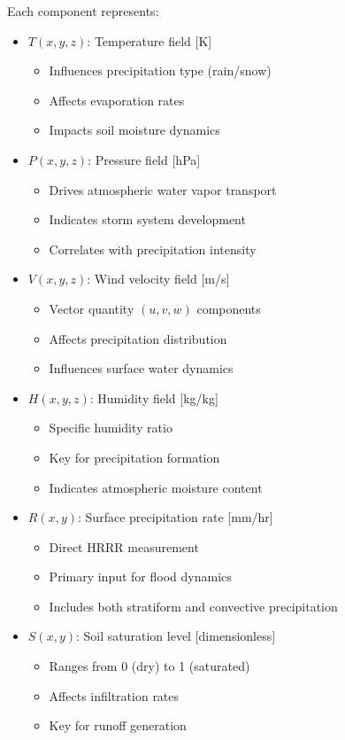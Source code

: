 \documentclass{article}
\begin{document}
Each component represents:
\begin{itemize}
\item $T(x,y,z)$: Temperature field [K]
    \begin{itemize}
    \item Influences precipitation type (rain/snow)
    \item Affects evaporation rates
    \item Impacts soil moisture dynamics
    \end{itemize}

\item $P(x,y,z)$: Pressure field [hPa]
    \begin{itemize}
    \item Drives atmospheric water vapor transport
    \item Indicates storm system development
    \item Correlates with precipitation intensity
    \end{itemize}

\item $V(x,y,z)$: Wind velocity field [m/s]
    \begin{itemize}
    \item Vector quantity $(u,v,w)$ components
    \item Affects precipitation distribution
    \item Influences surface water dynamics
    \end{itemize}

\item $H(x,y,z)$: Humidity field [kg/kg]
    \begin{itemize}
    \item Specific humidity ratio
    \item Key for precipitation formation
    \item Indicates atmospheric moisture content
    \end{itemize}

\item $R(x,y)$: Surface precipitation rate [mm/hr]
    \begin{itemize}
    \item Direct HRRR measurement
    \item Primary input for flood dynamics
    \item Includes both stratiform and convective precipitation
    \end{itemize}

\item $S(x,y)$: Soil saturation level [dimensionless]
    \begin{itemize}
    \item Ranges from 0 (dry) to 1 (saturated)
    \item Affects infiltration rates
    \item Key for runoff generation
    \end{itemize}


\end{itemize}
\end{document}
